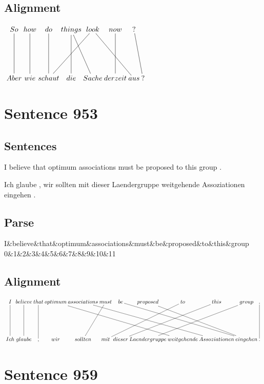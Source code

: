 \documentclass{report}
\begin{document}
\subsection*{Alignment}
\scriptsize{
$
\xymatrix@C-2.3pc{
So \ar @{-} [dd] & how \ar @{-} [dd] & do \ar @{-} [dd] & things \ar @{-} [ddr] \ar @{-} [dd] & look \ar @{-} [ddrr] \ar @{-} [ddll] & now \ar @{-} [dd] & ? \ar @{-} [ddr]\\\\
Aber & wie & schaut & die & Sache & derzeit & aus & ?
}$}
\newpage\section*{Sentence 953}

\subsection*{Sentences}
I believe that optimum associations must be proposed to this group .

\noindent Ich glaube , wir sollten mit dieser Laendergruppe weitgehende Assoziationen eingehen .



\subsection*{Parse}
\begin{dependency}[theme=simple]
\begin{deptext}[column sep=.5cm, row sep=.1ex]
I\&believe\&that\&optimum\&associations\&must\&be\&proposed\&to\&this\&group\\
0\&1\&2\&3\&4\&5\&6\&7\&8\&9\&10\&11\\
\end{deptext}
\end{dependency}


\subsection*{Alignment}
\scriptsize{
$
\xymatrix@C-2.3pc{
I \ar @{-} [dd] & believe \ar @{-} [dd] & that \ar @{-} [dd] & optimum \ar @{-} [ddrrrrr] & associations \ar @{-} [ddrrrrr] & must \ar @{-} [ddl] & be \ar @{-} [ddrrrr] & proposed \ar @{-} [ddrrr] & to \ar @{-} [ddlll] & this \ar @{-} [ddlll] & group \ar @{-} [ddlll] & . \ar @{-} [dd]\\\\
Ich & glaube & , & wir & sollten & mit & dieser & Laendergruppe & weitgehende & Assoziationen & eingehen & .
}$}
\newpage\section*{Sentence 959}
\end{document}
